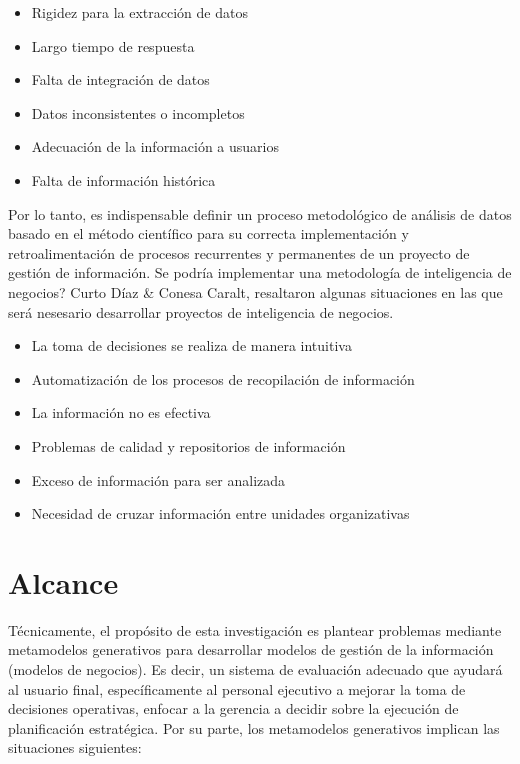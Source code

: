 \documentclass[11pt,titlepage]{report}
\begin{document}
\begin{itemize}
\item Rigidez para la extracción de datos
\item Largo tiempo de respuesta
\item Falta de integración de datos
\item Datos inconsistentes o incompletos
\item Adecuación de la información a usuarios
\item Falta de información histórica
\end{itemize}

Por lo tanto, es indispensable definir un proceso metodológico de análisis de datos basado en el método científico para su correcta implementación y retroalimentación de procesos recurrentes y permanentes de un proyecto de gestión de información. Se podría implementar una metodología de inteligencia de negocios? Curto Díaz \& Conesa Caralt, resaltaron algunas situaciones en las que será nesesario desarrollar proyectos de inteligencia de negocios.
\begin{itemize}
\item La toma de decisiones se realiza de manera intuitiva
\item Automatización de los procesos de recopilación de información
\item La información no es efectiva
\item Problemas de calidad y repositorios de información
\item Exceso de información para ser analizada
\item Necesidad de cruzar información entre unidades organizativas
\end{itemize}


\section{Alcance}
Técnicamente, el propósito de esta investigación es plantear problemas mediante metamodelos generativos para desarrollar modelos de gestión de la información (modelos de negocios). Es decir, un sistema de evaluación adecuado que ayudará al usuario final, específicamente al personal ejecutivo a mejorar la toma de decisiones operativas, enfocar a la gerencia a decidir sobre la ejecución de planificación estratégica. Por su parte, los metamodelos generativos implican las situaciones siguientes:
\end{document}
